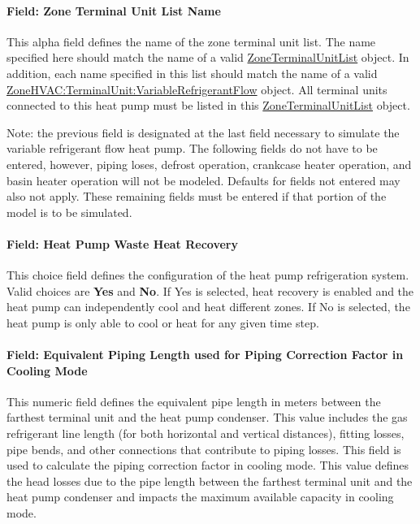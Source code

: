 \paragraph{Field: Zone Terminal Unit List Name}\label{field-zone-terminal-unit-list-name}

This alpha field defines the name of the zone terminal unit list. The name specified here should match the name of a valid \hyperref[zoneterminalunitlist]{ZoneTerminalUnitList} object. In addition, each name specified in this list should match the name of a valid \hyperref[zonehvacterminalunitvariablerefrigerantflow]{ZoneHVAC:TerminalUnit:VariableRefrigerantFlow} object. All terminal units connected to this heat pump must be listed in this \hyperref[zoneterminalunitlist]{ZoneTerminalUnitList} object.

Note: the previous field is designated at the last field necessary to simulate the variable refrigerant flow heat pump. The following fields do not have to be entered, however, piping loses, defrost operation, crankcase heater operation, and basin heater operation will not be modeled. Defaults for fields not entered may also not apply. These remaining fields must be entered if that portion of the model is to be simulated.

\paragraph{Field: Heat Pump Waste Heat Recovery}\label{field-heat-pump-waste-heat-recovery-000}

This choice field defines the configuration of the heat pump refrigeration system. Valid choices are \textbf{Yes} and \textbf{No}. If Yes is selected, heat recovery is enabled and the heat pump can independently cool and heat different zones. If No is selected, the heat pump is only able to cool or heat for any given time step.

\paragraph{Field: Equivalent Piping Length used for Piping Correction Factor in Cooling Mode}\label{field-equivalent-piping-length-used-for-piping-correction-factor-in-cooling-mode-000}

This numeric field defines the equivalent pipe length in meters between the farthest terminal unit and the heat pump condenser. This value includes the gas refrigerant line length (for both horizontal and vertical distances), fitting losses, pipe bends, and other connections that contribute to piping losses. This field is used to calculate the piping correction factor in cooling mode. This value defines the head losses due to the pipe length between the farthest terminal unit and the heat pump condenser and impacts the maximum available capacity in cooling mode.

